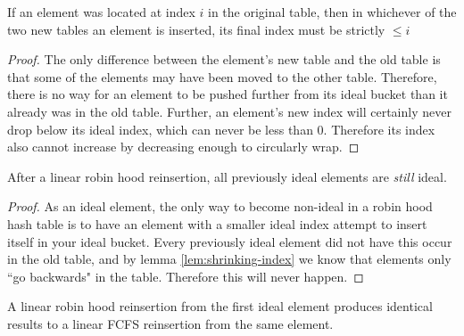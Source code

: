 \documentclass{cccg13}
\begin{document}
\begin{lemma} \label{lem:shrinking-index}
  If an element was located at index $i$ in the original table, then in whichever of the two new tables an element is inserted, its final index must be strictly $\leq i$
\end{lemma}

\begin{proof}
  The only difference between the element's new table and the old table is that some of the elements may have been moved to the other table. Therefore, there is no way for an element to be pushed further from its ideal bucket than it already was in the old table. Further, an element's new index will certainly never drop below its ideal index, which can never be less than $0$. Therefore its index also cannot increase by decreasing enough to circularly wrap.
\end{proof}

\begin{lemma} \label{lem:still-ideal}
  After a linear robin hood reinsertion, all previously ideal elements are \emph{still} ideal.
\end{lemma}

\begin{proof}
   As an ideal element, the only way to become non-ideal in a robin hood hash table is to have an element with a smaller ideal index attempt to insert itself in your ideal bucket. Every previously ideal element did not have this occur in the old table, and by lemma \ref{lem:shrinking-index} we know that elements only ``go backwards" in the table. Therefore this will never happen.
\end{proof}

\begin{theorem}
  A linear robin hood reinsertion from the first ideal element produces identical results to a linear FCFS reinsertion from the same element.
\end{theorem}
\end{document}
